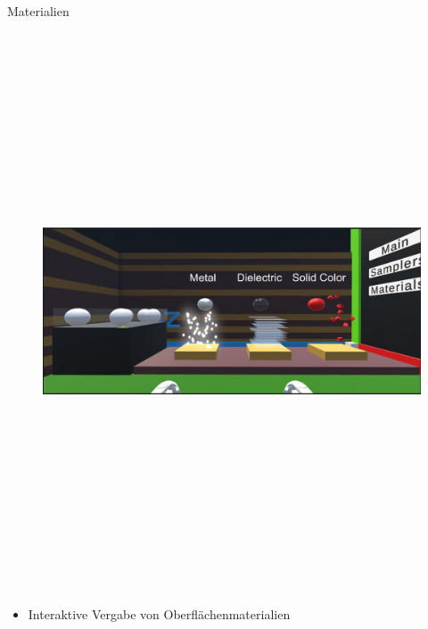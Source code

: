 \documentclass[final,hyperref={pdfpagelabels=false}]{beamer}
\begin{document}
\begin{frame}[t]
\begin{columns}[t]
\begin{column}{.4675\textwidth}
\begin{block}{Materialien}
    \begin{figure}
    	\center
        \includegraphics[height=16.5cm]{sphereCreating}
    \end{figure}


    

	\begin{itemize}
		\item Interaktive Vergabe von Oberflächenmaterialien
	\end{itemize}


\end{block}
\end{column}
\end{columns}
\end{frame}
\end{document}
